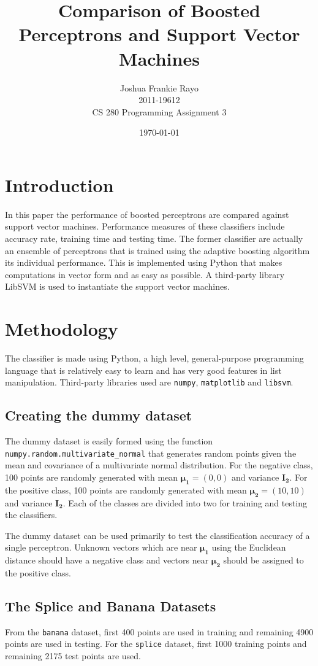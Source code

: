 \documentclass{article}
\title{Comparison of Boosted Perceptrons and Support Vector Machines}
\author{Joshua Frankie Rayo\\2011-19612\\CS 280 Programming Assignment 3}
\date{\today}
\begin{document}
\maketitle
\tableofcontents

\section{Introduction}
	In this paper the performance of boosted perceptrons are compared against support vector machines. Performance measures of these classifiers include accuracy rate, training time and testing time. The former classifier are actually an ensemble of perceptrons that is trained using the adaptive boosting algorithm its individual performance. This is implemented using Python that makes computations in vector form and as easy as possible. A third-party library LibSVM is used to instantiate the support vector machines.
\section{Methodology}
The classifier is made using Python, a high level, general-purpose programming language that is relatively easy to learn and has very good features in list manipulation. Third-party libraries used are \texttt{numpy}, \texttt{matplotlib} and \texttt{libsvm}.
\subsection{Creating the dummy dataset}
The dummy dataset is easily formed using the function \texttt{numpy.random.multivariate\_normal} that generates random points given the mean and covariance of a multivariate normal distribution. For the negative class, 100 points are randomly generated with mean $\mathbf{\mu_1} = (0,0)$ and variance $\mathbf{I_2}$. For the positive class, 100 points are randomly generated with mean $\mathbf{\mu_2} = (10,10)$ and variance $\mathbf{I_2}$. Each of the classes are divided into two for training and testing the classifiers.

The dummy dataset can be used primarily to test the classification accuracy of a single perceptron. Unknown vectors which are near $\mathbf{\mu_1}$ using the Euclidean distance should have a negative class and vectors near $\mathbf{\mu_2}$ should be assigned to the positive class.

\subsection{The Splice and Banana Datasets}
From the \texttt{banana} dataset, first 400 points are used in training and remaining 4900 points are used in testing. For the \texttt{splice} dataset, first 1000 training points and remaining 2175 test points are used.
\end{document}
